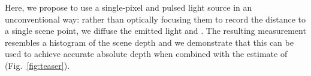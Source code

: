 

Here, we propose to use a single-pixel  and pulsed light source in an
unconventional way: rather than optically focusing them to record the distance
to a single scene point, we diffuse the emitted light and . The resulting  measurement
resembles a histogram of the scene depth and we demonstrate that this can be
used to achieve accurate absolute depth when combined with the estimate of
(Fig.~\ref{fig:teaser}).







